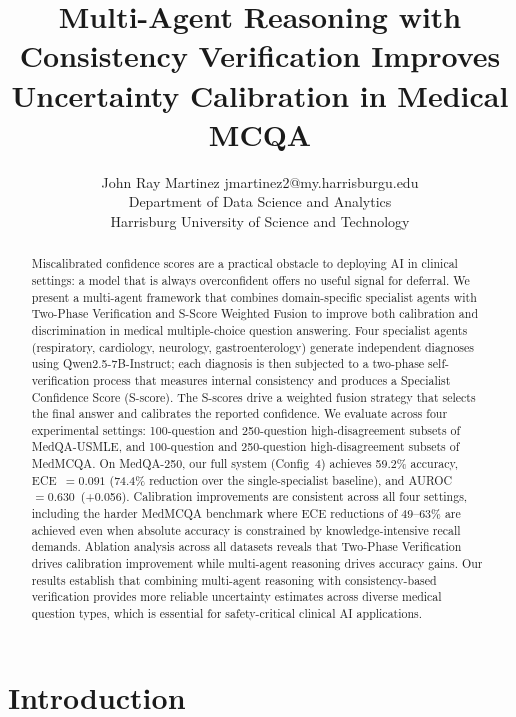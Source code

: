 \documentclass[10pt]{article}
\title{Multi-Agent Reasoning with Consistency Verification Improves Uncertainty Calibration in Medical MCQA}
\author{\name John Ray Martinez \email jmartinez2@my.harrisburgu.edu \\
      \addr Department of Data Science and Analytics\\
      Harrisburg University of Science and Technology}
\begin{document}
\maketitle

\begin{abstract}
Miscalibrated confidence scores are a practical obstacle to deploying AI
in clinical settings: a model that is always overconfident offers no useful
signal for deferral.  We present a multi-agent framework that combines
domain-specific specialist agents with Two-Phase Verification
\citep{wu2024uncertainty} and S-Score Weighted Fusion to improve both
calibration and discrimination in medical multiple-choice question answering.
Four specialist agents (respiratory, cardiology, neurology, gastroenterology)
generate independent diagnoses using Qwen2.5-7B-Instruct; each
diagnosis is then subjected to a two-phase self-verification process that
measures internal consistency and produces a Specialist Confidence Score
(S-score).  The S-scores drive a weighted fusion strategy that selects the
final answer and calibrates the reported confidence.  We evaluate across four
experimental settings: 100-question and 250-question high-disagreement subsets
of MedQA-USMLE, and 100-question and 250-question high-disagreement subsets of
MedMCQA.  On MedQA-250, our full system (Config~4) achieves 59.2\% accuracy,
ECE~$= 0.091$ (74.4\% reduction over the single-specialist baseline), and
AUROC~$= 0.630$~(+0.056).  Calibration improvements are consistent across all
four settings, including the harder MedMCQA benchmark where ECE reductions of
49--63\% are achieved even when absolute accuracy is constrained by
knowledge-intensive recall demands.  Ablation analysis across all datasets
reveals that Two-Phase Verification drives calibration improvement while
multi-agent reasoning drives accuracy gains.  Our results
establish that combining multi-agent reasoning with consistency-based
verification provides more reliable uncertainty estimates across diverse medical
question types, which is essential for safety-critical clinical AI applications.
\end{abstract}

\section{Introduction}
\label{sec:intro}
\end{document}
